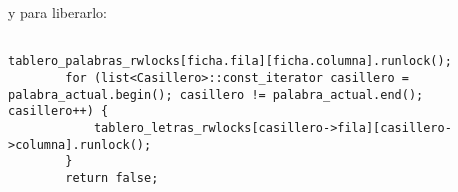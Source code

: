 y para liberarlo:

\begin{lstlisting}

tablero_palabras_rwlocks[ficha.fila][ficha.columna].runlock();
        for (list<Casillero>::const_iterator casillero = palabra_actual.begin(); casillero != palabra_actual.end(); casillero++) {
            tablero_letras_rwlocks[casillero->fila][casillero->columna].runlock();
        }
        return false;
   \end{lstlisting}

